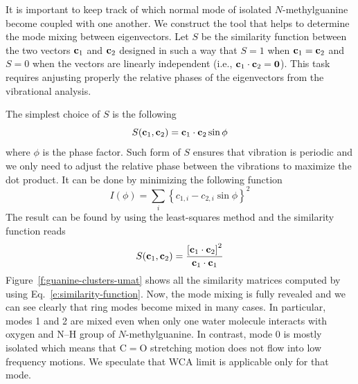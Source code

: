 \documentclass[a4paper,titlepage,twoside,fleqn,12pt]{book}
\begin{document}
It is important to keep track of which normal mode of isolated
$N$-methylguanine become coupled with one another.
We construct the tool that helps to determine
the mode mixing between eigenvectors.
Let $S$ be the similarity function between the two
vectors ${\bf c}_1$ and ${\bf c}_2$ designed in such a way that
$S=1$ when ${\bf c}_1={\bf c}_2$ and $S=0$ when the vectors
are linearly independent (i.e., ${\bf c}_1\cdot {\bf c}_2={\bf 0}$).
This task requires anjusting properly the relative phases
of the eigenvectors from the vibrational analysis.

The simplest choice of $S$ is the following
%
\begin{equation}  
  S({\bf c}_1,{\bf c}_2) = {\bf c}_1\cdot {\bf c}_2 \sin{\phi}
\end{equation}
%
where $\phi$ is the phase factor. Such form of $S$ ensures that
vibration is periodic and we only need to adjust the relative phase
between the vibrations to maximize the dot product.
It can be done by minimizing the following function
%
\begin{equation}  
  I(\phi) = \sum_i \left\{ c_{1,i} - c_{2,i} \sin{\phi}\right\}^2
\end{equation}
%
The result can be found by using the least\hyp{}squares method
and the similarity function reads
%
\begin{equation}  \label{e:similarity-function}
  S({\bf c}_1,{\bf c}_2) = \frac{ \left[{\bf c}_1\cdot {\bf c}_2 \right]^2}{{\bf c}_1\cdot {\bf c}_1}
\end{equation}
%
Figure~\ref{f:guanine-clusters-umat} shows all the similarity
matrices computed by using Eq.~\eqref{e:similarity-function}. 
Now, the mode mixing is fully revealed and
we can see clearly that ring modes become mixed in many cases. 
In particular,
modes 1 and 2 are mixed even when only one water molecule
interacts with oxygen and N--H group of $N$-methylguanine. In contrast, mode 0 is mostly
isolated which means that C$=$O stretching motion does not flow into
low frequency motions. We speculate that WCA limit is applicable only for that
mode.
%
\end{document}
